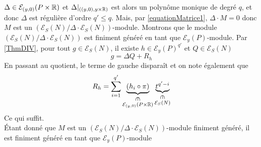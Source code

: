 \documentclass[memoire.tex]{subfiles}
\begin{document}
\begin{preuve}
    $\Delta\in\mathcal{E}_{(y,0)}(P\times\mathbb{R})$ et $\Delta|_
    {((y,0),y\times \mathbb{R})}$ est alors un polynôme monique 
    de degré $q$, et donc $\Delta$ est
    régulière d'ordre $q'\leq q$. Mais, par 
    \ref{equationMatrice1}, $\Delta\cdot M=0$ donc $M$  est un $(\mathcal{E}_S(N)/\Delta\cdot\mathcal{E}_S(N))$-module.
    Montrons que le module $(\mathcal{E}_S(N)/\Delta\cdot\mathcal{E}_S(N))$ est finiment généré en tant que $\mathcal{E}_y(P)$-module. Par \ref{ThmDIV}, pour tout $g\in\mathcal{E}_S(N)$, il existe $h\in\mathcal{E}_y(P)^{q'}$ et $Q\in\mathcal{E}_S(N)$
    \begin{equation*}
        g=\Delta Q +R_h
    \end{equation*}
    En passant au quotient, le terme de gauche disparaît et on note également que
    \begin{equation*}
        R_h = \sum_{i=1}^{q'} \underbrace{(h_i \circ \pi)}_{\substack{\rotatebox{-90}{$\in$} \\ \mathcal{E}_{(y,0)}(P\times\R)}} \underbrace{t^{q'-i}}_{\substack{\rotatebox{-90}{$\in$} \\ \mathcal{E}_S(N)}}
    \end{equation*}
    Ce qui suffit.\\
    Étant donné que $M$ est un $(\mathcal{E}_S(N)/\Delta\cdot\mathcal{E}_S(N))$-module finiment généré, il est finiment généré en tant que $\mathcal{E}_y(P)$-module
\end{preuve}
\end{document}

